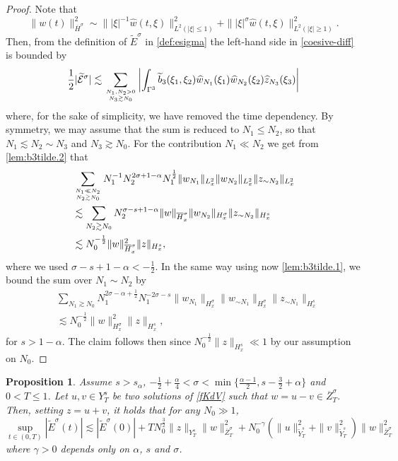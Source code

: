 \documentclass{amsart}
\newtheorem{proposition}[theorem]{Proposition}
\theoremstyle{definition}
\theoremstyle{remark}
\numberwithin{equation}{section}
\begin{document}
\begin{proof}
  Note that 
  \[ \|w(t)\|_{\overline{H}^\sigma}^2 \sim \||\xi|^{-1}\widehat{w}(t,\xi)\|_{L^2(|\xi|\le 1)}^2 + \||\xi|^{\sigma}\widehat{w}(t,\xi)\|_{L^2(|\xi| \ge 1)}^2.\]
 Then, from the definition of $\widetilde{E}^{\sigma}$ in \eqref{def:esigma} the left-hand side in \eqref{coesive-diff} is bounded by
  $$
  \frac 12|\widetilde{\mathcal{E}}^\sigma| \lesssim \sum_{N_1,N_2>0\atop N_3\gtrsim N_0} \left| \int_{\Gamma^3} \widetilde{b}_3(\xi_1,\xi_2) \widehat{w}_{N_1}(\xi_1) \widehat{w}_{N_2}(\xi_2)\widehat{z}_{N_3}(\xi_3) \right|
  $$
 where, for the sake of simplicity, we have removed the time dependency. By symmetry, we may assume that the sum is reduced to $N_1\le N_2$, so that $N_1\lesssim N_2\sim N_3$  and $N_3 \gtrsim N_0$. For the contribution $N_1\ll N_2$ we get from \eqref{lem:b3tilde.2} that 
   \begin{align*}
     & \sum_{N_1\ll N_2\atop N_2\gtrsim N_0} N_1^{-1}N_2^{2\sigma+1-\alpha} N_1^{\frac 12} \|w_{N_1}\|_{L^2_x} \|w_{N_2}\|_{L^2_x} \|z_{\sim N_2}\|_{L^2_x} \\
    &\lesssim \sum_{N_2\gtrsim N_0} N_2^{\sigma-s+1-\alpha} \|w\|_{\overline{H}^\sigma_x} \|w_{N_2}\|_{H^\sigma_x} \|z_{\sim N_2}\|_{H^s_x}\\
    &\lesssim N_0^{-\frac 12} \|w\|_{\overline{H}^\sigma_x}^2 \|z\|_{H^s_x}, 
  \end{align*}
  where we used $\sigma-s+1-\alpha<-\frac12$. In the same way using now \eqref{lem:b3tilde.1}, we bound the sum over $N_1\sim N_2$ by
  \begin{align*}
     & \sum_{N_1\gtrsim N_0} N_1^{2\sigma-\alpha+\frac 12} N_1^{-2\sigma-s} \|w_{N_1}\|_{H^\sigma_x} \|w_{\sim N_1}\|_{H^\sigma_x} \|z_{\sim N_1}\|_{H^s_x}\\
    &\lesssim N_0^{-\frac 12} \|w\|_{H^\sigma_x}^2 \|z\|_{H^s_x},
  \end{align*}
for $s>1-\alpha$. The claim follows then since $N_0^{-\frac 12}\|z\|_{H^s_x}\ll 1$ by our assumption on $N_0$.
\end{proof}
\begin{proposition} \label{prop:E_tilde_sigma}
  Assume $s>s_\alpha$, $-\frac 1 2 +\frac \alpha 4< \sigma<\min \{\frac{\alpha-1}2,s-\frac 32+ \alpha\}$ and $0<T\le 1$. Let $u, v\in Y^s_T$ be two solutions of \eqref{fKdV} such that $w=u-v\in \overline{Z}^\sigma_T$. Then, setting $z=u+v$, it holds that for any $N_0\gg 1$,
  \begin{equation}\label{est:Esigma}
    \sup_{t\in (0,T)} |\widetilde{E}^\sigma(t)| \lesssim |\widetilde{E}^\sigma(0)| + TN_0^{\frac 32} \|z\|_{Y^s_T} \|w\|_{\overline{Z}^\sigma_T}^2 +  N_0^{-\gamma}(\|u\|_{\widetilde{Y}^s_T}^2 + \|v\|_{\widetilde{Y}^s_T}^2) \|w\|_{\overline{Z}^\sigma_T}^2
  \end{equation}
  where $\gamma>0$ depends only on $\alpha$, $s$ and $\sigma$.
\end{proposition}
\end{document}
